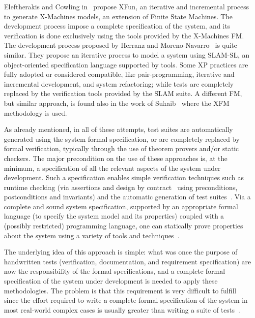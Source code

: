 \documentclass[english]{lni}
\begin{document}
Eleftherakis and Cowling in~\cite{Eleftherakis2003} propose XFun, an
iterative and incremental process to generate X-Machines models, an
extension of Finite State Machines.  The development process impose a
complete specification of the system, and its verification is done
exclusively using the tools provided by the X-Machines FM.  The
development process proposed by Herranz and
Moreno-Navarro~\cite{Herranz2003b} is quite similar.  They propose an
iterative process to model a system using SLAM-SL, an object-oriented
specification language supported by tools.  Some XP practices are
fully adopted or considered compatible, like pair-programming,
iterative and incremental development, and system refactoring; while
tests are completely replaced by the verification tools provided by
the SLAM suite.  A different FM, but similar approach, is found also
in the work of Suhaib~\cite{Suhaib2005} where the XFM methodology is
used.

As already mentioned, in all of these attempts, test suites are
automatically generated using the system formal specification, or are
completely replaced by formal verification, typically through the use
of theorem provers and/or static checkers.  The major precondition on
the use of these approaches is, at the minimum, a specification of all
the relevant aspects of the system under development.  Such a
specification enables simple verification techniques such as runtime
checking (via assertions and design by contract~\cite{Meyer1997} using
preconditions, postconditions and invariants) and the automatic
generation of test suites~\cite{Cheon2002,Cheon2004,Cheon2005}.  Via a
complete and sound system specification, supported by an appropriate
formal language (to specify the system model and its properties)
coupled with a (possibly restricted) programming language, one can
statically prove properties about the system using a variety of tools
and
techniques~\cite{CatanoHuisman02,DetlefsNelsonSaxe2005,KiniryCok04}.

The underlying idea of this approach is simple: what was once the
purpose of handwritten tests (verification, documentation, and
requirement specification) are now the responsibility of the formal
specifications, and a complete formal specification of the system
under development is needed to apply these methodologies.  The problem
is that this requirement is very difficult to fulfill since the effort
required to write a complete formal specification of the system in
most real-world complex cases is usually greater than writing a suite
of tests~\cite{Glass2002}.  
\end{document}
